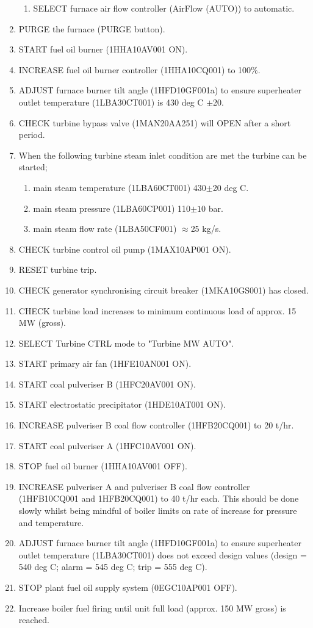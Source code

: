 \documentclass[10pt,a4paper]{article}
\begin{document}
\begin{enumerate}
\begin{enumerate}
\item SELECT furnace air flow controller (AirFlow (AUTO)) to automatic.
\end{enumerate}
\item PURGE the furnace (PURGE button).
\item START fuel oil burner (1HHA10AV001 ON). 
\item INCREASE fuel oil burner controller (1HHA10CQ001) to 100\%.
\item ADJUST furnace burner tilt angle (1HFD10GF001a) to ensure superheater outlet temperature (1LBA30CT001) is 430 deg C $\pm$20.
\item CHECK turbine bypass valve (1MAN20AA251) will OPEN after a short period.
\item When the following turbine steam inlet condition are met the turbine can be started;
\begin{enumerate}
\item main steam temperature (1LBA60CT001) 430$\pm$20 deg C.
\item main steam pressure (1LBA60CP001) 110$\pm10$ bar.
\item main steam flow rate (1LBA50CF001) $\approx$25 kg/s. 
\end{enumerate}
\item CHECK turbine control oil pump (1MAX10AP001 ON).
\item RESET turbine trip.
\item CHECK generator synchronising circuit breaker (1MKA10GS001) has closed.
\item CHECK turbine load increases to minimum continuous load of approx. 15 MW (gross).
\item SELECT Turbine CTRL mode to "Turbine MW AUTO". 
\item START primary air fan (1HFE10AN001 ON). 
\item START coal pulveriser B (1HFC20AV001 ON). 
\item START electrostatic precipitator (1HDE10AT001 ON). 
\item INCREASE pulveriser B coal flow controller (1HFB20CQ001) to 20 t/hr.
\item START coal pulveriser A (1HFC10AV001 ON). 
\item STOP fuel oil burner (1HHA10AV001 OFF).
\item INCREASE pulveriser A and pulveriser B coal flow controller (1HFB10CQ001 and 1HFB20CQ001) to 40 t/hr each. This should be done slowly whilst being mindful of boiler limits on rate of increase for pressure and temperature.
\item ADJUST furnace burner tilt angle (1HFD10GF001a) to ensure superheater outlet temperature (1LBA30CT001) does not exceed design values (design = 540 deg C; alarm = 545 deg C; trip = 555 deg C).
\item STOP plant fuel oil supply system (0EGC10AP001 OFF).
\item Increase boiler fuel firing until unit full load (approx. 150 MW gross) is reached.
\end{enumerate}
\end{document}
